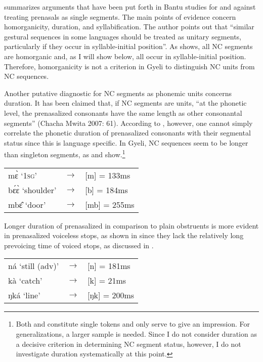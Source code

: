 \citet{chacha2007} summarizes arguments that have been put forth in Bantu studies for and against treating prenasals as single segments. The main points of evidence concern homorganicity, duration, and syllabification. The author points out that ``similar gestural sequences in some languages should be treated as unitary segments, particularly if they occur in syllable-initial position''. As  shows, all NC segments are homorganic and, as I will show below, all occur in syllable-initial position. Therefore, homorganicity is not a criterion in Gyeli to distinguish NC units from NC sequences.

Another putative diagnostic for NC segments as phonemic units concerns duration. It has been claimed that, if NC segments are units, 
 ``at the phonetic level, the prenasalized consonants have the same length as other consonantal segments'' (Chacha Mwita 2007: 61). According to \citet[183]{downing2005}, however, one cannot simply correlate the phonetic duration of prenasalized consonants with their segmental status since this is language specific. In Gyeli, NC sequences seem to be longer than singleton segments, as  and  show.\footnote{Both  and  constitute single tokens and only serve to give an impression. For generalizations, a larger sample is needed. Since I do not consider duration as a decisive criterion in determining NC segment status, however, I do not investigate duration systematically at this point.}

\ea \label{durationNCb}
\begin{tabular}{lll}
mɛ̀ `1\textsc{sg}' & $\rightarrow$ & [m] = 133ms\\
bɛ́ɛ̀ `shoulder' & $\rightarrow$ & [b] = 184ms \\
mbɛ̂ `door' &  $\rightarrow$ & [mb] = 255ms\\
\end{tabular}
\z

\noindent Longer duration of prenasalized in comparison to plain obstruents is more evident in prenasalized voiceless stops, as shown in  since they lack the relatively long prevoicing time of voiced stops, as discussed in .

\ea \label{durationNCk}
\begin{tabular}{lll}
ná `still (adv)' & $\rightarrow$ & [n] = 181ms\\
kà `catch' & $\rightarrow$ & [k] = 21ms \\
ŋká `line' &  $\rightarrow$ & [ŋk] = 200ms\\
\end{tabular}
\z

